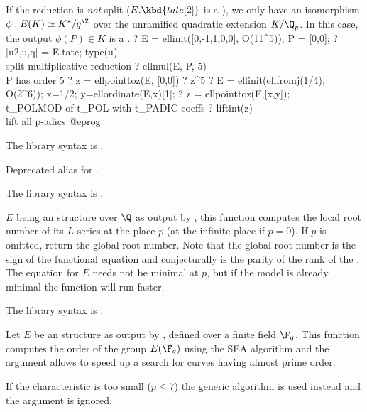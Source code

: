 \item If the reduction is \emph{not} split ($E.\kbd{tate[2]}$ is a
), we only have an isomorphism $\phi: E(K) \simeq K^*/q^\Z$ over
the unramified quadratic extension $K/\Q_p$. In this case, the output
$\phi(P)\in K$ is a .
\bprog
? E = ellinit([0,-1,1,0,0], O(11^5)); P = [0,0];
? [u2,u,q] = E.tate; type(u) \\ split multiplicative reduction
? ellmul(E, P, 5)  \\ P has order 5
? z = ellpointtoz(E, [0,0])
? z^5
? E = ellinit(ellfromj(1/4), O(2^6)); x=1/2; y=ellordinate(E,x)[1];
? z = ellpointtoz(E,[x,y]); \\ t_POLMOD of t_POL with t_PADIC coeffs
? liftint(z) \\ lift all p-adics
@eprog

The library syntax is .

\label{se:ellpow}
Deprecated alias for .

The library syntax is .

\label{se:ellrootno}
$E$ being an  structure over $\Q$ as output by ,
this function computes the local root number of its $L$-series at the place
$p$ (at the infinite place if $p = 0$). If $p$ is omitted, return the global
root number. Note that the global root number is the sign of the functional
equation and conjecturally is the parity of the rank of the
. The equation for $E$ needs not be minimal at $p$,
but if the model is already minimal the function will run faster.

The library syntax is .

\label{se:ellsea}
Let $E$ be an  structure as output by , defined over
a finite field $\F_q$. This function computes the order of the group
$E(\F_q)$ using the SEA algorithm and the  argument allows to
speed up a search for curves having almost prime order.

\item If the characteristic is too small ($p \leq 7$) the generic algorithm
 is used instead and the  argument is ignored.

